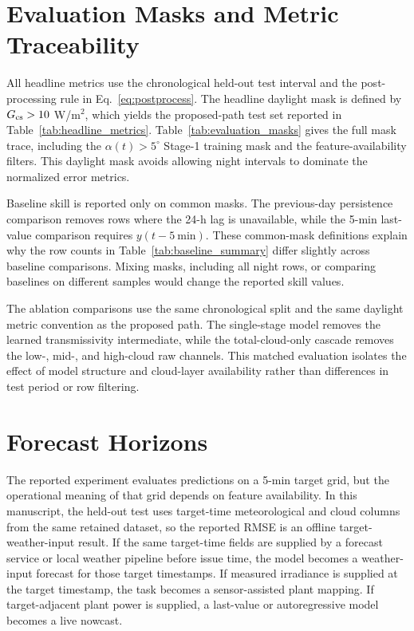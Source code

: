 \section{Evaluation Masks and Metric Traceability}
\label{app:metric_trace}

All headline metrics use the chronological held-out test interval and the post-processing rule in Eq.~\eqref{eq:postprocess}. The headline daylight mask is defined by $G_{\mathrm{cs}}>10$ W/m$^2$, which yields the proposed-path test set reported in Table~\ref{tab:headline_metrics}. Table~\ref{tab:evaluation_masks} gives the full mask trace, including the $\alpha(t)>5^\circ$ Stage-1 training mask and the feature-availability filters. This daylight mask avoids allowing night intervals to dominate the normalized error metrics.

Baseline skill is reported only on common masks. The previous-day persistence comparison removes rows where the 24-h lag is unavailable, while the 5-min last-value comparison requires $y(t-5~\mathrm{min})$. These common-mask definitions explain why the row counts in Table~\ref{tab:baseline_summary} differ slightly across baseline comparisons. Mixing masks, including all night rows, or comparing baselines on different samples would change the reported skill values.

The ablation comparisons use the same chronological split and the same daylight metric convention as the proposed path. The single-stage model removes the learned transmissivity intermediate, while the total-cloud-only cascade removes the low-, mid-, and high-cloud raw channels. This matched evaluation isolates the effect of model structure and cloud-layer availability rather than differences in test period or row filtering.

\section{Forecast Horizons}
\label{app:horizon_note}

The reported experiment evaluates predictions on a 5-min target grid, but the operational meaning of that grid depends on feature availability. In this manuscript, the held-out test uses target-time meteorological and cloud columns from the same retained dataset, so the reported RMSE is an offline target-weather-input result. If the same target-time fields are supplied by a forecast service or local weather pipeline before issue time, the model becomes a weather-input forecast for those target timestamps. If measured irradiance is supplied at the target timestamp, the task becomes a sensor-assisted plant mapping. If target-adjacent plant power is supplied, a last-value or autoregressive model becomes a live nowcast.

